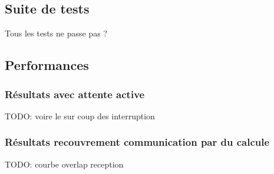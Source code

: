 \subsection{Suite de tests}

Tous les tests ne passe pas ?

\subsection{Performances}

\subsubsection{Résultats avec attente active}

TODO: voire le sur coup des interruption

\subsubsection{Résultats recouvrement communication par du calcule}

TODO: courbe overlap reception
